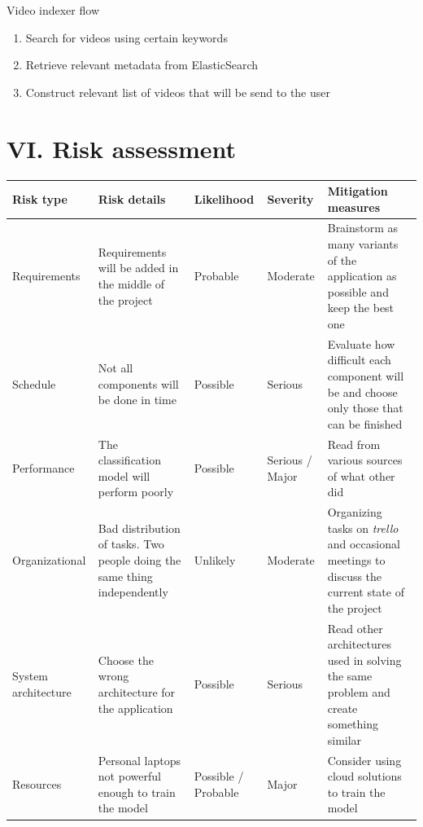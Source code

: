 \documentclass[11pt, a4papper]{report}
\theoremstyle{plain}
\theoremstyle{definition}
\theoremstyle{definition}
\theoremstyle{proposition}
\begin{document}
Video indexer flow

\begin{enumerate}
	\item Search for videos using certain keywords
	\item Retrieve relevant metadata from ElasticSearch
	\item Construct relevant list of videos that will be send to the user
\end{enumerate}



\chapter*{VI. Risk assessment}

\begin{center}
\begin{tabular}{ | C{2.5cm} | C{3cm}| C{1.5cm} | C{1.5cm} | C{3cm} | } 
 \hline
 Risk type & Risk details & Likelihood & Severity & Mitigation measures \\ 
 \hline
 Requirements & Requirements will be added in the middle of the project & Probable & Moderate & Brainstorm as many variants of the application as possible and keep the best one \\
 \hline
 Schedule & Not all components will be done in time & Possible & Serious & Evaluate how difficult each component will be and choose only those that can be finished \\
 \hline
 Performance & The classification model will perform poorly & Possible & Serious / Major & Read from various sources of what other did \\
 \hline
 Organizational & Bad distribution of tasks. Two people doing the same thing independently & Unlikely & Moderate & Organizing tasks on \textit{trello} and occasional meetings to discuss the current state of the project \\
 \hline
 System architecture & Choose the wrong architecture for the application & Possible & Serious & Read other architectures used in solving the same problem and create something similar \\
 \hline
 Resources & Personal laptops not powerful enough to train the model & Possible / Probable & Major & Consider using cloud solutions to train the model \\
 \hline
\end{tabular}
\end{center}
\end{document}
